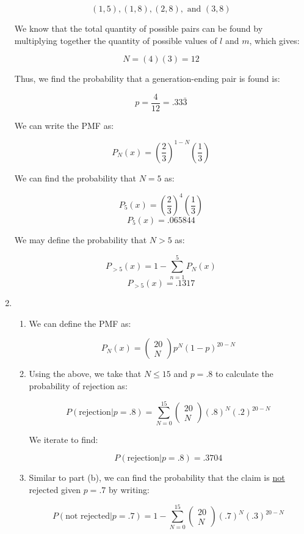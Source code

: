 \begin{enumerate}
    $$(1,5),(1,8),(2,8),\text{ and }(3,8)$$

    We know that the total quantity of possible pairs can be found by multiplying together the quantity of possible values of $l$ and $m$, which gives:

    $$N=(4)(3)=12$$

    Thus, we find the probability that a generation-ending pair is found is:

    $$p=\frac{4}{12}=.33\bar{3}$$

    We can write the PMF as:

    $$\boxed{P_N(x)=\left( \frac{2}{3} \right)^{1-N}\left( \frac{1}{3} \right)}$$

    We can find the probability that $N=5$ as:

    $$P_5(x)=\left( \frac{2}{3} \right)^4\left( \frac{1}{3} \right)$$
    $$\boxed{P_5(x)=.065844}$$

    We may define the probability that $N>5$ as:

    $$P_{>5}(x)=1-\sum_{n=1}^{5} P_N(x)$$
    $$\boxed{P_{>5}(x)=.1317}$$

  \item

    \begin{enumerate}

      \item We can define the PMF as:

        $$\boxed{P_N(x)=\left( \begin{matrix} 20\\ N\end{matrix} \right)p^N(1-p)^{20-N}}$$

      \item Using the above, we take that $N\leq 15$ and $p=.8$ to calculate the probability of rejection as:

        $$P(\text{rejection}|p=.8)=\sum_{N=0}^{15}\left( \begin{matrix} 20\\ N\end{matrix} \right)(.8)^N(.2)^{20-N}$$

        We iterate to find:
        
        $$\boxed{P(\text{rejection}|p=.8)=.3704}$$

      \item Similar to part (b), we can find the probability that the claim is \underline{not} rejected given $p=.7$ by writing:

        $$P(\text{not rejected}|p=.7)=1-\sum_{N=0}^{15}\left( \begin{matrix} 20\\ N\end{matrix} \right)(.7)^N(.3)^{20-N}$$


\end{enumerate}
\end{enumerate}
